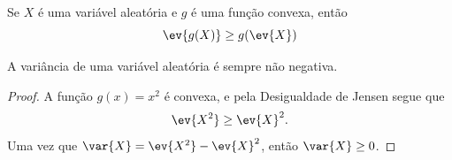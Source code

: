 \begin{thm:desigualdade de jansen}
Se $X$ é uma variável aleatória e $g$ é uma função convexa, então
\[
    \ev{g(X)} \ge g(\ev{X})
\]
\end{thm:desigualdade de jansen}

\begin{cor:variancia positiva}
A variância de uma variável aleatória é sempre não negativa.
\end{cor:variancia positiva}
\begin{proof}
A função $g(x) = x^2$ é convexa, e pela Desigualdade de Jensen segue que
\[
    \ev{X^2} \ge \ev{X}^2.
\]
Uma vez que $\var{X} = \ev{X^2} - \ev{X}^2$, então $\var{X} \ge 0$.
\end{proof}


